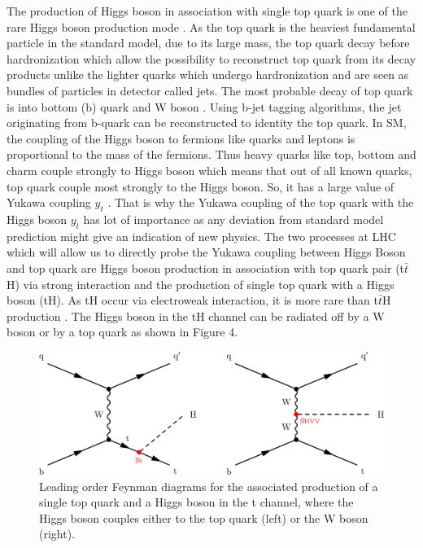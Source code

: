 \documentclass[final,3p]{CSP}
\begin{document}
The production of Higgs boson in association with single top quark is one of the rare Higgs 
boson production mode \cite{Khachatryan_2016}. As the top 
quark is the heaviest fundamental particle in the standard model, due to its large mass, the 
top quark decay before 
hardronization which allow the possibility to reconstruct top quark from its decay products 
unlike the lighter quarks which 
undergo hardronization and are seen as bundles of particles in detector called jets. The most 
probable decay of top quark is 
into bottom (b) quark and W boson \cite{nishiwaki2014tth}. Using b-jet tagging algorithms, the jet originating from 
b-quark can be reconstructed to 
identity the top quark. In SM, the coupling of the Higgs boson to fermions like quarks and 
leptons is proportional to the mass 
of the fermions. Thus heavy quarks like top, bottom and charm couple strongly to Higgs boson 
which means that out of all known 
quarks, top quark couple most strongly to the Higgs boson. So, it has a large value of Yukawa 
coupling $y_t$ \cite{Aad_2016}. That is why the 
Yukawa coupling of the top quark with the Higgs boson $y_t$ has lot of importance as any 
deviation from standard model prediction might give an indication of new physics. The two 
processes at LHC which will allow us to directly probe the Yukawa 
coupling between Higgs Boson and top quark are Higgs boson production in association with top 
quark pair (t$\bar{t}$H) via 
strong interaction and the production of single top quark with a Higgs boson (tH). As tH 
occur via electroweak interaction, it 
is more rare than t$\bar{t}$H production \cite{sirunyan2018search}. The Higgs boson in the tH channel can be radiated 
off by a W boson or by a top quark as shown in Figure 4.

\begin{figure}[H]
	\centering
	\includegraphics[width=\columnwidth]{./cms.png}
	\caption{\onehalfspacing Leading order Feynman diagrams for the associated production of a single top quark and a Higgs boson in the t channel, where the Higgs boson couples either to the top quark (left) or the W boson (right).}
	\label{figure 4}
\end{figure}
\end{document}
